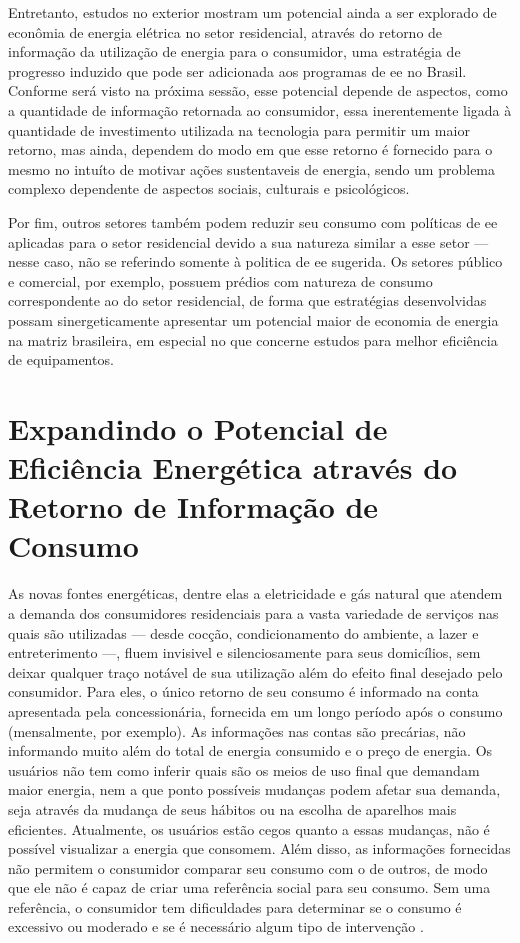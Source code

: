 Entretanto, estudos no exterior mostram um potencial ainda a ser explorado de
econômia de energia elétrica no setor residencial, através do retorno de
informação da utilização de energia para o consumidor, uma estratégia de
progresso induzido que pode ser adicionada aos programas de \gls{ee} no Brasil. 
Conforme será visto na próxima sessão, esse potencial depende de aspectos, como a quantidade 
de informação retornada ao consumidor, essa inerentemente ligada à quantidade de
investimento utilizada na tecnologia para permitir um maior retorno, mas ainda,
dependem do modo em que esse retorno é fornecido para o mesmo no intuíto de
motivar ações sustentaveis de energia, sendo um problema complexo dependente de
aspectos sociais, culturais e psicológicos. 

Por fim, outros setores também podem reduzir seu consumo com políticas de
\gls{ee} aplicadas para o setor residencial devido a sua natureza similar a esse
setor --- nesse caso, não se referindo somente à politica de \gls{ee} sugerida. 
Os setores público e comercial, por exemplo, possuem prédios com natureza
de consumo correspondente ao do setor residencial, de forma que estratégias 
desenvolvidas possam sinergeticamente apresentar um potencial maior de 
economia de energia na matriz brasileira, em especial no que concerne estudos
para melhor eficiência de equipamentos.

\section{Expandindo o Potencial de Eficiência Energética através do Retorno de
Informação de Consumo}
\label{sec:ee_res_exp}

As novas fontes energéticas, dentre elas a eletricidade e gás natural
que atendem a demanda dos consumidores residenciais para a vasta 
variedade de serviços nas quais são utilizadas 
--- desde cocção, condicionamento do ambiente, a lazer e 
entreterimento ---, fluem invisivel e silenciosamente para seus domicílios, sem
deixar qualquer traço notável de sua utilização além do efeito final desejado pelo
consumidor. Para eles, o único retorno de seu consumo é informado na conta
apresentada pela concessionária, fornecida em um longo período após o consumo
(mensalmente, por exemplo). As informações nas contas são precárias, não informando 
muito além do total de energia consumido e o preço de energia. 
Os usuários não tem como inferir quais são os meios de uso final que demandam 
maior energia, nem a que ponto possíveis mudanças podem afetar sua demanda, 
seja através da mudança de seus hábitos ou na escolha 
de aparelhos mais eficientes. Atualmente, os usuários estão cegos quanto a essas
mudanças, não é possível visualizar a energia que consomem. Além disso, as
informações fornecidas não permitem o consumidor comparar seu consumo com o de
outros, de modo que ele não é capaz de criar uma referência social para seu consumo.
Sem uma referência, o consumidor tem dificuldades para determinar se o consumo é
excessivo ou moderado e se é necessário algum tipo de intervenção 
\cite{aceee_2010_estudos_feedback}.

